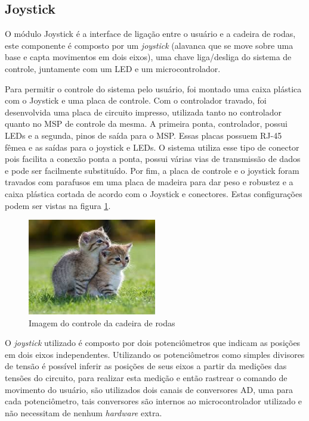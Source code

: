 \subsection{Joystick}

  O módulo Joystick é a interface de ligação entre o usuário e a cadeira de rodas, este componente é composto por um \textit{joystick} (alavanca que se move sobre uma base e capta movimentos em dois eixos), uma chave liga/desliga do sistema de controle, juntamente com um LED e um microcontrolador.

  Para permitir o controle do sistema pelo usuário, foi montado uma caixa plástica com o Joystick e uma placa de controle. Com o controlador travado, foi desenvolvida uma placa de circuito impresso, utilizada tanto no controlador quanto no MSP de controle da mesma. A primeira ponta, controlador, possui LEDs e a segunda, pinos de saída para o MSP. Essas placas possuem RJ-45 fêmea e as saídas para o joystick e LEDs. O sistema utiliza esse tipo de conector pois facilita a conexão ponta a ponta, possui várias vias de transmissão de dados e pode ser facilmente substituído. Por fim, a placa de controle e o joystick foram travados com parafusos em uma placa de madeira para dar peso e robustez e a caixa plástica cortada de acordo com o Joystick e conectores. Estas configurações podem ser vistas na figura \ref{fig:joy_hand_control}.

  \begin{figure}[!htb]
  \centering
  \includegraphics[width = 0.5\textwidth]{figuras/resultados/joy_hand_control}
  \caption{Imagem do controle da cadeira de rodas}
  \label{fig:joy_hand_control}
  \end{figure}

  O \textit{joystick} utilizado é composto por dois potenciômetros que indicam as posições em dois eixos independentes. Utilizando os potenciômetros como simples divisores de tensão é possível inferir as posições de seus eixos a partir da medições das tensões do circuito, para realizar esta medição e então rastrear o comando de movimento do usuário, são utilizados dois canais de conversores AD, uma para cada potenciômetro, tais conversores são internos ao microcontrolador utilizado e não necessitam de nenhum \textit{hardware} extra.

